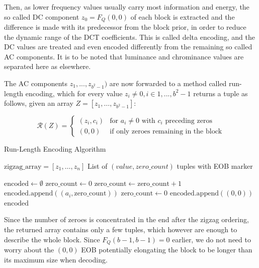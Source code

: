 Then, as lower frequency values usually carry most information and energy, the so called DC component \(z_0 = F_Q(0,0)\) of each block is extracted and the difference is made with its predecessor from the block prior, in order to reduce the dynamic range of the DCT coefficients. This is called delta encoding, and the DC values are treated and even encoded differently from the remaining so called AC components. It is to be noted that luminance and chrominance values are separated here as elsewhere.

The AC components \(z_1,...,z_{b^2-1})\) are now forwarded to a method called run-length encoding, which for every value \(z_i \neq 0, i \in {1,...,b^2-1}\) returns a tuple as follows, given an array \(Z = [z_1, \ldots, z_{b^2-1}]\):

\begin{equation*}
	\mathcal{R}(Z) = \begin{cases}
		(z_i, c_i) & \text{for } a_i \neq 0 \text{ with } c_i \text{ preceding zeros} \\
		(0,0) & \text{if only zeroes remaining in the block}
	\end{cases}
\end{equation*}


\begin{algorithm}
	\caption{Run-Length Encoding Algorithm}
	\label{alg:jpeg-rle}
	\begin{algorithmic}[1]
		\Require $\text{zigzag\_array} = [z_1, \ldots, z_n]$
		\Ensure List of $(value, zero\_count)$ tuples with EOB marker
		
		\State $\text{encoded} \gets \emptyset$
		\State $\text{zero\_count} \gets 0$
		\State $\text{zero\_count} \gets \text{zero\_count} + 1$
		\Else
		\State $\text{encoded.append}((a_i, \text{zero\_count}))$
		\State $\text{zero\_count} \gets 0$ 
		\EndIf
		\EndFor
		\State $\text{encoded.append}((0, 0))$ 
		\State \Return $\text{encoded}$
	\end{algorithmic}
\end{algorithm}

Since the number of zeroes is concentrated in the end after the zigzag ordering, the returned array contains only a few tuples, which however are enough to describe the whole block. Since \(F_Q(b-1,b-1) = 0\) earlier, we do not need to worry about the \((0,0)\) EOB potentially elongating the block to be longer than its maximum size when decoding.


